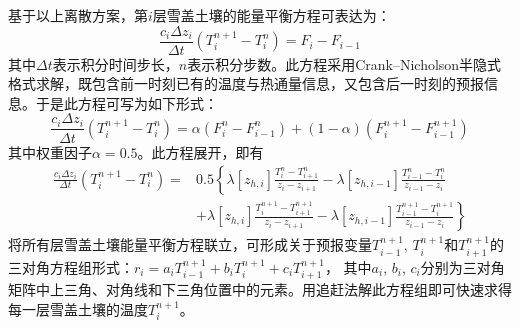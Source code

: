 基于以上离散方案，第$i$层雪盖土壤的能量平衡方程可表达为：
\begin{equation}
\frac{c_{i} \Delta z_{i}}{\Delta t}\left(T_{i}^{n+1}-T_{i}^{n}\right)=F_{i}-F_{i-1}
\end{equation}
%
其中$\Delta t$表示积分时间步长，$n$表示积分步数。此方程采用Crank--Nicholson半隐式格式求解，既包含前一时刻已有的温度与热通量信息，又包含后一时刻的预报信息。于是此方程可写为如下形式：
\begin{equation}
\frac{c_{i} \Delta z_{i}}{\Delta t}\left(T_{i}^{n+1}-T_{i}^{n}\right)=\alpha\left(F_{i}^{n}-F_{i-1}^{n}\right)+(1-\alpha)\left(F_{i}^{n+1}-F_{i-1}^{n+1}\right)
\end{equation}
其中权重因子$\alpha=0.5$。此方程展开，即有
\begin{equation}
\begin{aligned} 
\frac{c_{i} \Delta z_{i}}{\Delta t}\left(T_{i}^{n+1}-T_{i}^{n}\right)=& 0.5\left\{\lambda\left[z_{h, i}\right] \frac{T_{i}^{n}-T_{i+1}^{n}}{z_{i}-z_{i+1}}-\lambda\left[z_{h, i-1}\right] \frac{T_{i-1}^{n}-T_{i}^{n}}{z_{i-1}-z_{i}}\right.\\[1ex] &\left.+\lambda\left[z_{h, i}\right] \frac{T_{i}^{n+1}-T_{i+1}^{n+1}}{z_{i}-z_{i+1}}-\lambda\left[z_{h, i-1}\right] \frac{T_{i-1}^{n+1}-T_{i}^{n+1}}{z_{i-1}-z_{i}}\right\} 
\end{aligned}
\end{equation}
将所有层雪盖土壤能量平衡方程联立，可形成关于预报变量$T_{i-1}^{n+1}$, $T_i^{n+1}$和$T_{i+1}^{n+1}$的三对角方程组形式：$r_i=a_iT_{i-1}^{n+1}+b_iT_i^{n+1}+c_iT_{i+1}^{n+1}$，
其中$a_i$, $b_i$, $c_i$分别为三对角矩阵中上三角、对角线和下三角位置中的元素。用追赶法解此方程组即可快速求得每一层雪盖土壤的温度$T_i^{n+1}$。


